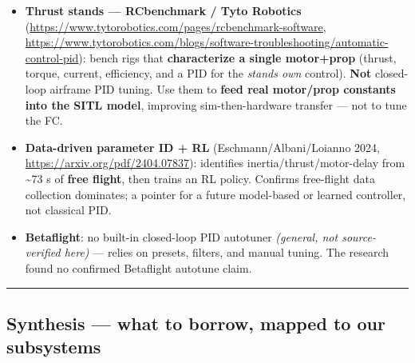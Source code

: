 \documentclass[
  11pt,
]{article}
\providecommand{\tightlist}{%
  \setlength{\itemsep}{0pt}\setlength{\parskip}{0pt}}
\begin{document}
\begin{itemize}
\tightlist
\item
  \textbf{Thrust stands --- RCbenchmark / Tyto Robotics}
  (\url{https://www.tytorobotics.com/pages/rcbenchmark-software},
  \url{https://www.tytorobotics.com/blogs/software-troubleshooting/automatic-control-pid}):
  bench rigs that \textbf{characterize a single motor+prop} (thrust,
  torque, current, efficiency, and a PID for the
  \emph{stand\textquotesingle s own} control). \textbf{Not} closed-loop
  airframe PID tuning. Use them to \textbf{feed real motor/prop
  constants into the SITL model}, improving sim-then-hardware transfer
  --- not to tune the FC.
\item
  \textbf{Data-driven parameter ID + RL} (Eschmann/Albani/Loianno 2024,
  \url{https://arxiv.org/pdf/2404.07837}): identifies
  inertia/thrust/motor-delay from \textasciitilde73 s of \textbf{free
  flight}, then trains an RL policy. Confirms free-flight data
  collection dominates; a pointer for a future model-based or learned
  controller, not classical PID.
\item
  \textbf{Betaflight}: no built-in closed-loop PID autotuner
  \emph{(general, not source-verified here)} --- relies on presets,
  filters, and manual tuning. The research found no confirmed Betaflight
  autotune claim.
\end{itemize}

\begin{center}\rule{0.5\linewidth}{0.5pt}\end{center}

\hypertarget{synthesis--what-to-borrow-mapped-to-our-subsystems}{%
\subsection{Synthesis --- what to borrow, mapped to our
subsystems}\label{synthesis--what-to-borrow-mapped-to-our-subsystems}}
\end{document}
